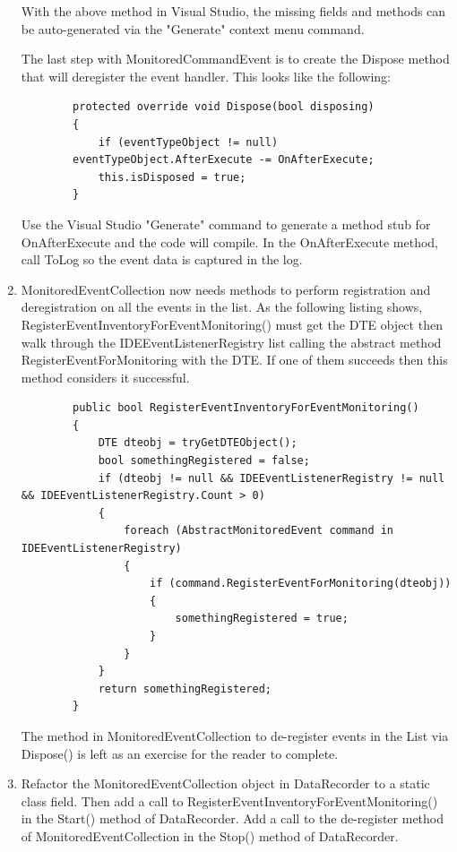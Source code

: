 \begin{Exercise}
\begin{enumerate}
With the above method in Visual Studio, the missing fields and methods can be auto-generated via the "Generate" context menu command.  

The last step with MonitoredCommandEvent is to create the Dispose method that will deregister the event handler. This looks like the following:

\begin{lstlisting}
        protected override void Dispose(bool disposing)
        {
            if (eventTypeObject != null) 
		eventTypeObject.AfterExecute -= OnAfterExecute;
            this.isDisposed = true;
        }
\end{lstlisting}

Use the Visual Studio "Generate" command to generate a method stub for OnAfterExecute and the
code will compile.  In the OnAfterExecute method, call ToLog so the event data is captured in the log.

\item
MonitoredEventCollection now needs methods to perform registration and deregistration on all the events in the list.  As the following listing shows, RegisterEventInventoryForEventMonitoring() must get the DTE object then walk through the IDEEventListenerRegistry list calling the abstract method RegisterEventForMonitoring with the DTE.  If one of them succeeds then this method considers it successful.

\begin{lstlisting}
        public bool RegisterEventInventoryForEventMonitoring()
        {
            DTE dteobj = tryGetDTEObject();
            bool somethingRegistered = false;
            if (dteobj != null && IDEEventListenerRegistry != null && IDEEventListenerRegistry.Count > 0)
            {
                foreach (AbstractMonitoredEvent command in IDEEventListenerRegistry)
                {
                    if (command.RegisterEventForMonitoring(dteobj))
                    {
                        somethingRegistered = true;
                    }
                }
            }
            return somethingRegistered;
        }
\end{lstlisting}

The method in MonitoredEventCollection to de-register events in the List via Dispose() is left as an exercise for the reader to complete.

\item
Refactor the MonitoredEventCollection object in DataRecorder to a static class field.  Then add a call to RegisterEventInventoryForEventMonitoring() in the Start() method of DataRecorder.  Add a call to the de-register method of MonitoredEventCollection in the Stop() method of DataRecorder.  


\end{enumerate}
\end{Exercise}
